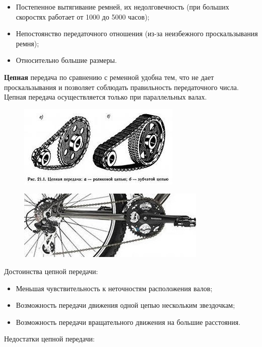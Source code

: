 \begin{itemize}
	\item Постепенное вытягивание ремней, их недолговечность (при больших скоростях работает от 1000 до 5000 часов);
	\item Непостоянство передаточного отношения (из-за неизбежного проскальзывания ремня);
	\item Относительно большие размеры.\\
\end{itemize}

{\bfseries Цепная} передача по сравнению с ременной удобна тем, что не дает проскальзывания и позволяет соблюдать правильность передаточного числа. Цепная передача осуществляется только при параллельных валах.

\begin{figure}[h!]
	\begin{center}
		\includegraphics[width=1\linewidth]{chapters/chapter5/images/9}
		\caption{}
		\label{ris:image5x8}
	\end{center}
\end{figure}	
\clearpage
\begin{figure}[h!]
	\begin{center}
		\includegraphics[width=0.72\linewidth]{chapters/chapter5/images/10}
		\caption{}
		\label{ris:image5x9}
	\end{center}
\end{figure}	
\noindent Достоинства цепной передачи:	

\begin{itemize}
	\item Меньшая чувствительность к неточностям расположения валов;
	\item Возможность передачи движения одной цепью нескольким звездочкам;
	\item Возможность передачи вращательного движения на большие расстояния.\\
\end{itemize}
Недостатки цепной передачи:

